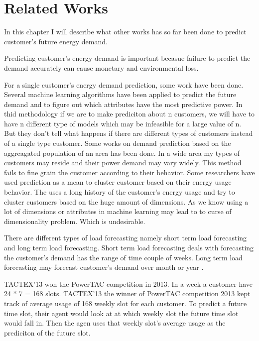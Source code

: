 
\chapter{Related Works}



In this chapter I will describe what other works has so far been done to predict customer's future energy demand.

Predicting customer's energy demand is important becasue failure to predict the demand accurately can cause monetary and environmental loss. 

For a single customer's energy demand prediction, some work  have been done. Several machine learning algorithms have been applied to predict the future demand and to figure out which attributes have the most predictive power. In thid methodology if we are to make prediciton about n customers, we will have to have n different type of models which may be infeasible for a large value of n. But they don't tell what happens if there are different types of customers instead of a single type customer. Some works on demand prediction based on the aggreagated population of an area has been done. In a wide area my types of customers may reside and their power demand may vary widely. This method fails to fine grain the customer according to their behavior. Some researchers have used prediction as a mean to cluster customer based on their energy usage behavior. The uses a long history of the customer's energy usage and try to cluster customers based on the huge amount of dimensions. As we know using a lot of dimensions or attributes in machine learning may lead to to curse of dimensionality problem. Which is undesirable.


There are different types of load forecasting namely short term load forecasting and long term load forecasting. Short term load forecasting deals with forecasting the customer's demand has the range of time couple of weeks. Long term load forecasting may forecast customer's demand over month or year \cite{cho1995customer}.

TACTEX'13 won the PowerTAC competition in 2013. In a week a customer have 24 * 7 = 168 slots. TACTEX'13 the winner of PowerTAC competition 2013 kept track of average usage of 168 weekly slot for each customer. To predict a future time slot, their agent would look at at which weekly slot the future time slot would fall in. Then the agen uses that weekly slot's average usage as the prediciton of the future slot.

